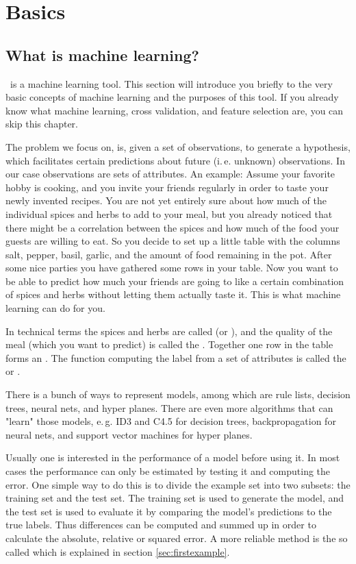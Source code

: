 \chapter{Basics}


\section{What is machine learning?}

\rapidminer\ is a machine learning tool. This section will introduce you
briefly to the very basic concepts of machine learning and the
purposes of this tool. If you already know what machine learning,
cross validation, and feature selection are, you can skip this
chapter.

The problem we focus on, is, given a set of observations, to generate a
hypothesis, which facilitates certain predictions about future
(i.\,e. unknown) observations. In our case observations are sets of
attributes. An example: Assume your favorite hobby is cooking, and you
invite your friends regularly in order to taste your newly invented
recipes. You are not yet entirely sure about how much of the
individual spices and herbs to add to your meal, but you already
noticed that there might be a correlation between the spices and how
much of the food your guests are willing to eat. So you decide to
set up a little table with the columns salt, pepper, basil, garlic,
and the amount of food remaining in the pot. After some nice parties
you have gathered some rows in your table. Now you want to be able to
predict how much your friends are going to like a certain combination
of spices and herbs without letting them actually taste it. This is
what machine learning can do for you.

In technical terms the spices and herbs are called
 (or ), and the quality of the
meal (which you want to predict) is called the
. Together one row in the table forms an
. The function computing the label from a set of
attributes is called the  or .

There is a bunch of ways to represent models, among which are
rule lists, decision trees, neural nets, and hyper planes. There are
even more algorithms that can "learn" those models, e.\,g. ID3 and
C4.5 for decision trees, backpropagation for neural nets, and support
vector machines for hyper planes.

Usually one is interested in the performance of a model before using
it. In most cases the performance can only be estimated by testing it and
computing the error. One simple way to do this is to divide the
example set into two subsets: the training set and the test set. The training
set is used to generate the model, and the test set is used to evaluate
it by comparing the model's predictions to the true labels. Thus
differences can be computed and summed up in order to calculate the
absolute, relative or squared error. A more reliable method is the so
called  which is explained in section
\ref{sec:firstexample}.

